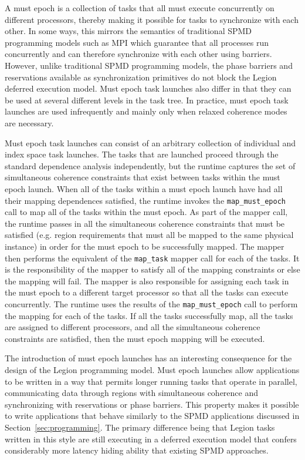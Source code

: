 A must epoch is a collection of tasks that all must
execute concurrently on different processors, thereby 
making it possible for tasks to synchronize with each 
other. In some ways, this mirrors the semantics of 
traditional SPMD programming models such as MPI which
guarantee that all processes run concurrently and can
therefore synchronize with each other using barriers.
However, unlike traditional SPMD programming models,
the phase barriers and reservations available as 
synchronization primitives do not block the Legion
deferred execution model. Must epoch task launches
also differ in that they can be used at several 
different levels in the task tree. In practice, 
must epoch task launches are used infrequently
and mainly only when relaxed coherence modes are
necessary.

Must epoch task launches can consist of an arbitrary 
collection of individual and
index space task launches. The tasks that are launched
proceed through the standard dependence analysis 
independently, but the runtime captures the set of 
simultaneous coherence constraints that exist between
tasks within the must epoch launch. When all of the
tasks within a must epoch launch have had all their
mapping dependences satisfied, the runtime invokes
the {\tt map\_must\_epoch} call to map all of the
tasks within the must epoch. As part of the mapper
call, the runtime passes in all the simultaneous
coherence constraints that must be satisfied 
(e.g. region requirements that must all be mapped
to the same physical instance) in order for the
must epoch to be successfully mapped. The mapper then 
performs the equivalent of the {\tt map\_task}
mapper call for each of the tasks. It is the
responsibility of the mapper to satisfy all of
the mapping constraints or else the mapping
will fail. The mapper is also responsible for 
assigning each task in the must epoch to a different
target processor so that all the tasks can
execute concurrently. The runtime uses the results
of the {\tt map\_must\_epoch} call to perform
the mapping for each of the tasks. If all the
tasks successfully map, all the tasks are assigned
to different processors, and all the simultaneous
coherence constraints are satisfied, then the
must epoch mapping will be executed.

The introduction of must epoch launches has an 
interesting consequence for the design of the 
Legion programming model. Must epoch launches
allow applications to be written in a way that
permits longer running tasks that operate in 
parallel, communicating data through regions with
simultaneous coherence and synchronizing with
reservations or phase barriers. This property
makes it possible to write applications that
behave similarly to the SPMD applications 
discussed in Section~\ref{sec:programming}. The
primary difference being that Legion tasks 
written in this style are still executing in
a deferred execution model that confers considerably
more latency hiding ability that existing
SPMD approaches.


